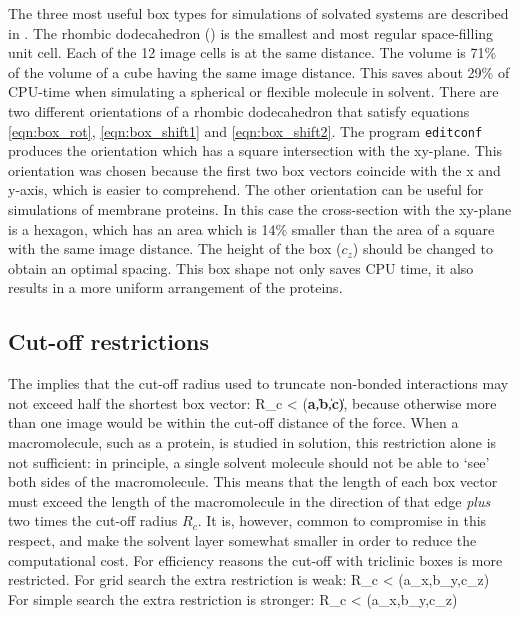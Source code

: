 The three most useful box types for simulations of solvated systems
are described in .  The rhombic dodecahedron
() is the smallest and most regular space-filling
unit cell. Each of the 12 image cells is at the same distance.  The
volume is 71\% of the volume of a cube having the same image
distance. This saves about 29\% of CPU-time when simulating a
spherical or flexible molecule in solvent. There are two different
orientations of a rhombic dodecahedron that satisfy equations
\ref{eqn:box_rot}, \ref{eqn:box_shift1} and \ref{eqn:box_shift2}.
The program {\tt editconf} produces the orientation
which has a square intersection with the xy-plane.  This orientation
was chosen because the first two box vectors coincide with the x and
y-axis, which is easier to comprehend. The other orientation can be
useful for simulations of membrane proteins. In this case the
cross-section with the xy-plane is a hexagon, which has an area which
is 14\% smaller than the area of a square with the same image
distance.  The height of the box ($c_z$) should be changed to obtain
an optimal spacing.  This box shape not only saves CPU time, it
also results in a more uniform arrangement of the proteins.

\subsection{Cut-off restrictions}
The  implies that the cut-off radius used to
truncate non-bonded interactions may not exceed half the shortest box
vector:
\beq
\label{eqn:physicalrc}
  R_c < \half \min(\|{\bf a}\|,\|{\bf b}\|,\|{\bf c}\|),
\eeq
because otherwise more than one image would be within the cut-off distance 
of the force. When a macromolecule, such as a protein, is studied in
solution, this restriction alone is not sufficient: in principle, a single
solvent molecule should not be able
to `see' both sides of the macromolecule. This means that the length of
each box vector must exceed the length of the macromolecule in the
direction of that edge {\em plus} two times the cut-off radius $R_c$.
It is, however, common to compromise in this respect, and make the solvent 
layer somewhat smaller in order to reduce the computational cost.
For efficiency reasons the cut-off with triclinic boxes is more restricted.
For grid search the extra restriction is weak:
\beq
\label{eqn:gridrc}
R_c < \min(a_x,b_y,c_z)
\eeq
For simple search the extra restriction is stronger:
\beq
\label{eqn:simplerc}
R_c < \half \min(a_x,b_y,c_z)
\eeq

